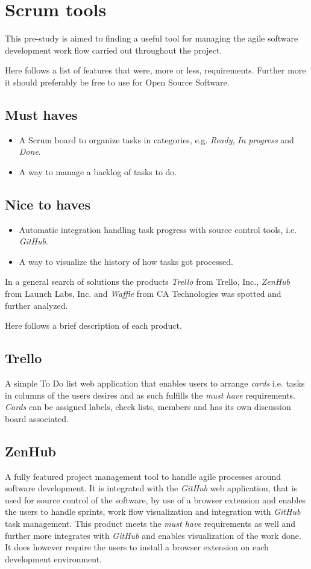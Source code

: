 \section{Scrum tools}
This pre-study is aimed to finding a useful tool for managing the agile software development work flow carried out throughout the project.

Here follows a list of features that were, more or less, requirements. Further more it should preferably be free to use for Open Source Software.

\subsection*{Must haves}
\begin{itemize}
\item A Scrum board to organize tasks in categories, e.g. \textit{Ready}, \textit{In progress} and \textit{Done}.
\item A way to manage a backlog of tasks to do.
\end{itemize}

\subsection*{Nice to haves}
\begin{itemize}
\item Automatic integration handling task progress with source control tools, i.e. \textit{GitHub}.
\item A way to visualize the history of how tasks got processed.
\end{itemize}

In a general search of solutions the products \textit{Trello} from Trello, Inc., \textit{ZenHub} from Launch Labs, Inc. and \textit{Waffle} from CA Technologies was spotted and further analyzed.

Here follows a brief description of each product.

\subsection*{Trello}
A simple To Do list web application that enables users to arrange \textit{cards} i.e. tasks in columns of the users desires and as such fulfills the \textit{must have} requirements.
\textit{Cards} can be assigned labels, check lists, members and has its own discussion board associated.

\subsection*{ZenHub}
A fully featured project management tool to handle agile processes around software development. 
It is integrated with the \textit{GitHub} web application, that is used for source control of the software, by use of a browser extension and enables the users to handle sprints, work flow visualization and integration with \textit{GitHub} task management. 
This product meets the \textit{must have} requirements as well and further more integrates with \textit{GitHub} and enables visualization of the work done.
It does however require the users to install a browser extension on each development environment.

